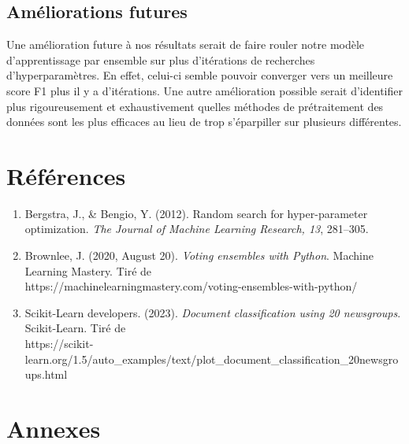 \documentclass{article}
\begin{document}
\subsection{Améliorations futures}
Une amélioration future à nos résultats serait de faire rouler notre modèle d'apprentissage par ensemble sur plus d'itérations de recherches d'hyperparamètres. En effet, celui-ci semble pouvoir converger vers un meilleure score F1 plus il y a d'itérations. Une autre amélioration possible serait d'identifier plus rigoureusement et exhaustivement quelles méthodes de prétraitement des données sont les plus efficaces au lieu de trop s'éparpiller sur plusieurs différentes.

\newpage
\section{Références}
\begin{enumerate}
    \item \label{bergstra2012random} Bergstra, J., \& Bengio, Y. (2012). Random search for hyper-parameter optimization. \textit{The Journal of Machine Learning Research, 13}, 281–305.
    \item Brownlee, J. (2020, August 20). \textit{Voting ensembles with Python}. Machine Learning Mastery. Tiré de \\    https://machinelearningmastery.com/voting-ensembles-with-python/
    \item Scikit-Learn developers. (2023). \textit{Document classification using 20 newsgroups}. Scikit-Learn. Tiré de \\ https://scikit-learn.org/1.5/auto\_examples/text/plot\_document\_classification\_20newsgroups.html

\end{enumerate}

\section{Annexes}
\end{document}
